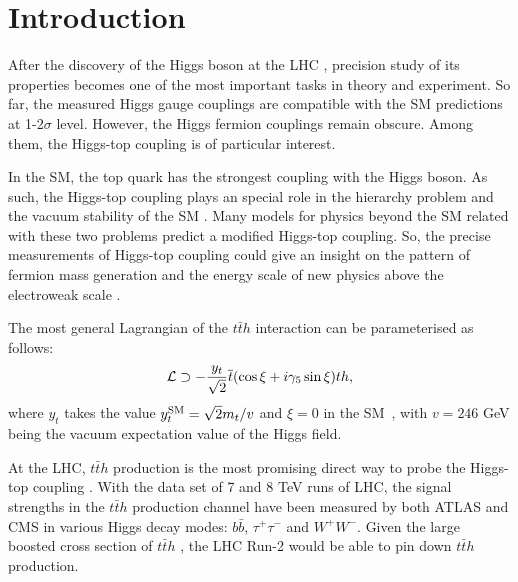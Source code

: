 \documentclass[twocolumn,prd,noshowpacs,nofootinbib,amsmath,amssymb,superscriptaddress,preprintnumbers]{revtex4}
\begin{document}
\section{Introduction}
After the discovery of the Higgs boson at the LHC \cite{higgs-atlas,higgs-cms}, precision study of its properties becomes one of the most important tasks in theory and experiment. So far, the measured Higgs gauge couplings are compatible with the SM predictions at 1-2$\sigma$ level. However, the Higgs fermion couplings remain obscure. Among them, the Higgs-top coupling is of particular interest.

In the SM, the top quark has the strongest coupling with the Higgs boson. As such, the Higgs-top coupling plays an special role in the hierarchy problem \cite{tHooft:1979rat} and the vacuum stability of the SM \cite{Sher:1988mj,Degrassi:2012ry}. Many models for physics beyond the SM related with these two problems predict a modified Higgs-top coupling. So, the precise measurements of Higgs-top coupling could give an insight on the pattern of fermion mass generation and the energy scale of new physics above the electroweak scale \cite{Bezrukov:2014ina}.

The most general Lagrangian of the $t\bar{t}h$ interaction can be parameterised as follows:
\begin{equation}
{\cal L} \supset -\frac{y_t}{\sqrt{2}}\overline{t}(\cos\xi+i\gamma_{5}\sin\xi)th,
\label{tth}
\end{equation}
where $y_t$ takes the value $y^{\rm SM}_t=\sqrt{2}m_t/v$ and $\xi=0$ in the SM~\cite{AguilarSaavedra:2009mx}, with $v=246$ GeV being the
vacuum expectation value of the Higgs field.

At the LHC, $t\bar{t}h$ production is the most promising direct way to probe the Higgs-top coupling \cite{Marciano:1991qq,Ellis:2013yxa,Kobakhidze:2014gqa,Khatibi:2014bsa,Yue:2014tya,Buckley:2015vsa,Boudjema:2015nda,Li:2015kaa,Gritsan:2016hjl,Dolan:2016qvg,Chang:2016mso,Cao:2016wib,Kobakhidze:2016mfx}. With the data set of 7 and 8 TeV runs of LHC, the signal strengths in the $t\bar{t}h$ production channel have been measured by both ATLAS \cite{Aad:2014lma,Aad:2015gra} and CMS \cite{Khachatryan:2014qaa} in various Higgs decay modes: $b\bar{b}$, $\tau^+\tau^-$ and $W^+W^-$. Given the large boosted cross section of $t\bar{t}h$ \cite{deFlorian:2016spz}, the LHC Run-2 would be able to pin down $t\bar{t}h$ production.
\end{document}
